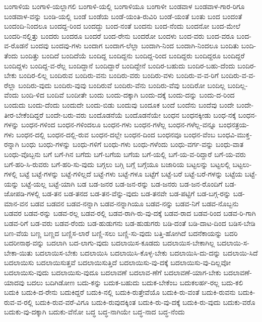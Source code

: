 {ಬಂಗಾಳಿಯ
ಬಂಗಾಳಿ-ಯಲ್ಲಾಗಲಿ
ಬಂಗಾಳಿ-ಯಲ್ಲಿ
ಬಂಗಾಳಿಯೂ
ಬಂಗಾಳೀ
ಬಂಡವಾಳ
ಬಂಡವಾಳ-ಗಾರ-ರಿಗೂ
ಬಂಡವಾಳ-ವನ್ನು
ಬಂಡಿ-ಯಲ್ಲಿ
ಬಂಡೆ
ಬಂಡೆಯ
ಬಂಡೆ-ಯಂತಿ-ರುವಿರಿ
ಬಂಡೆ-ಯಂತೆ
ಬಂತು
ಬಂದ
ಬಂದಂತೆ
ಬಂದಂದಿ-ನಿಂದಲೂ
ಬಂದದ್ದ-ರಿಂದ
ಬಂದದ್ದು
ಬಂದ-ನಂತೆ
ಬಂದನು
ಬಂದ-ನೆಂದು
ಬಂದನೋ
ಬಂದ-ಮೇಲೆ
ಬಂದರಿ-ನಲ್ಲಿತ್ತು
ಬಂದರು
ಬಂದರೂ
ಬಂದರೆ
ಬಂದ-ರೇನು
ಬಂದರೋ
ಬಂದಳು
ಬಂದ-ವರು
ಬಂದ-ವರೂ
ಬಂದ-ವ-ರೊಡನೆ
ಬಂದವು
ಬಂದವು-ಗಳು
ಬಂದಾಗ
ಬಂದಾಗ-ಲೆಲ್ಲಾ
ಬಂದಾಗಿ-ನಿಂದ
ಬಂದಾಗಿ-ನಿಂದಲೂ
ಬಂದಿತು
ಬಂದಿ-ತೆಂದು
ಬಂದಿತ್ತು
ಬಂದಿದೆ
ಬಂದಿದೆಯೆ
ಬಂದಿದ್ದ
ಬಂದಿದ್ದನು
ಬಂದಿದ್ದ-ರಿಂದ
ಬಂದಿದ್ದರು
ಬಂದಿದ್ದರೂ
ಬಂದಿದ್ದರೆ
ಬಂದಿದ್ದಳು
ಬಂದಿದ್ದ-ವ-ರೆಲ್ಲ
ಬಂದಿದ್ದಾನೆ
ಬಂದಿದ್ದಾರೆ
ಬಂದಿದ್ದೇನೆ
ಬಂದಿರ-ಬಹುದು
ಬಂದಿರ-ಬಹು-ದೆಂದು
ಬಂದಿರ-ಬೇಕು
ಬಂದಿರ-ಲಿಲ್ಲ
ಬಂದಿರುವ
ಬಂದಿರು-ವನು
ಬಂದಿರು-ವರು
ಬಂದಿರು-ವಳು
ಬಂದಿರು-ವ-ವ-ರಿಗೆ
ಬಂದಿರು-ವ-ವ-ರೆಲ್ಲಾ
ಬಂದಿರು-ವುದು
ಬಂದಿರು-ವುವು
ಬಂದಿರುವೆ
ಬಂದಿರು-ವೆನು
ಬಂದಿರು-ವೆವು
ಬಂದಿರೋ
ಬಂದಿಲ್ಲ
ಬಂದಿಲ್ಲ-ವೆಂದು
ಬಂದಿ-ಳಿದ
ಬಂದಿವೆ
ಬಂದೀತೇ
ಬಂದು
ಬಂದು-ದಕ್ಕಾಗಿ
ಬಂದು-ದಕ್ಕೆ
ಬಂದು-ದನ್ನು
ಬಂದು-ದ-ರಿಂದ
ಬಂದುದು
ಬಂದು-ದೆಂದು
ಬಂದುದೇ
ಬಂದು-ಬಿಡು
ಬಂದುವು
ಬಂದೂಕ
ಬಂದೆ
ಬಂದೆನು
ಬಂದೆವು
ಬಂದೇ
ಬಂದೇ-ತೀರ-ಬೇಕೆಂದಿದ್ದರೆ
ಬಂದೇ-ಬರು-ವರು
ಬಂದೊಡನೆಯೆ
ಬಂದೊಡನೆಯೇ
ಬಂಧನ
ಬಂಧನಕ್ಕೀಡು
ಬಂಧ-ನಕ್ಕೆ
ಬಂಧನ-ಗಳನ್ನು
ಬಂಧನ-ಗಳಿಂದ
ಬಂಧನ-ಗಳಿಂದಲೂ
ಬಂಧನ-ಗಳು
ಬಂಧನ-ಗಳೆಲ್ಲ
ಬಂಧನ-ಗಳೆಲ್ಲ-ವನ್ನೂ
ಬಂಧನತ್ರಯ-ಗಳು
ಬಂಧನ-ದಲ್ಲಿ
ಬಂಧನ-ದಲ್ಲಿ-ರುವ
ಬಂಧನ-ದಲ್ಲೇ
ಬಂಧನ-ದಿಂದ
ಬಂಧನವೂ
ಬಂಧನ-ವೆಂಬ
ಬಂಧವಿ-ಮುಕ್ತ-ರನ್ನಾಗಿ
ಬಂಧು
ಬಂಧು-ಗಳನ್ನು
ಬಂಧು-ಗಳಿಗೆ
ಬಂಧು-ಗಳು
ಬಂಧು-ಗಳೆಂದು
ಬಂಧು-ವರ್ಗ-ವನ್ನು
ಬಂಧು-ವಾತ
ಬಂಧು-ವೊಬ್ಬನು
ಬಗೆ
ಬಗೆ-ಗಿನ
ಬಗೆದು
ಬಗೆ-ಬಗೆಯ
ಬಗೆಯ
ಬಗೆ-ಯಲ್ಲಿ
ಬಗೆ-ಯ-ವ-ರಿದ್ದಾರೆ
ಬಗೆ-ಯ-ವರು
ಬಗೆ-ಹರಿ-ಸಿ-ರುವರು
ಬಗೆ-ಹರಿ-ಸು-ವುದು
ಬಗ್ಗಲು
ಬಗ್ಗಿ
ಬಗ್ಗೆ
ಬಗ್ಗೆಯೂ
ಬಜಾರಿಯ
ಬಟ್ಟಲನ್ನು
ಬಟ್ಟಲಲ್ಲಿ
ಬಟ್ಟಲು-ಗಳಲ್ಲಿ
ಬಟ್ಟೆ
ಬಟ್ಟೆ-ಗಳನ್ನು
ಬಟ್ಟೆ-ಗಳಿಲ್ಲದೆ
ಬಟ್ಟೆ-ಗಳು
ಬಟ್ಟೆ-ಗಳೂ
ಬಟ್ಟೆಗೆ
ಬಟ್ಟೆ-ಬರೆ
ಬಟ್ಟೆ-ಬರೆ-ಗಳನ್ನು
ಬಟ್ಟೆಯ
ಬಟ್ಟೆ-ಯನ್ನು
ಬಟ್ಟೆ-ಯಲ್ಲ
ಬಟ್ಟೆ-ಯಾಗಿ
ಬಡ
ಬಡ-ಜನರ
ಬಡ-ಜನ-ರನ್ನು
ಬಡ-ಜನರು
ಬಡ-ಜನ-ರೊಂದಿಗೆ
ಬಡ-ಜೋಪಡಿ-ಗಳಲ್ಲಿ
ಬಡ-ತನ
ಬಡ-ತನದ
ಬಡ-ತನ-ವೆನ್ನು-ವುದು
ಬಡ-ತನವೇ
ಬಡ-ಪಟ್ಟಿಗೆ
ಬಡ-ಬಗ್ಗ-ರನ್ನು
ಬಡ-ಮಾನ-ವನ
ಬಡವ
ಬಡವನ
ಬಡವ-ನನ್ನಾಗಿ
ಬಡವ-ನನ್ನಾಗಿಯೂ
ಬಡವ-ನನ್ನು
ಬಡವ-ನಿಗೆ
ಬಡವ-ನೊಬ್ಬನು
ಬಡವರ
ಬಡವ-ರನ್ನು
ಬಡವ-ರಲ್ಲ
ಬಡವ-ರಲ್ಲಿ
ಬಡವ-ರಾಗಿ-ರು-ವು-ದಕ್ಕೆ
ಬಡವ-ರಾದ
ಬಡವ-ರಿಂದ
ಬಡವ-ರಿ-ಗಾಗಿ
ಬಡವ-ರಿಗೆ
ಬಡ-ವರು
ಬಡವ-ರೆಂದು
ಬಡ-ಹುಡುಗನು
ಬಡ-ಹುಡುಗರು
ಬಡಿ-ದಂತೆ
ಬಡಿ-ದಾಟ-ದಿಂದ
ಬಡಿಸ-ಬೇಡಿ
ಬಣ-ವೆಯ
ಬಣ್ಣ
ಬಣ್ಣದ
ಬಣ್ಣಿಸ-ಲಾರೆ
ಬಣ್ಣಿ-ಸಲು
ಬಣ್ಣಿ-ಸು-ವುದು
ಬತ್ತಿ-ಹೋಗಿದೆ
ಬದನೆಕಾಯನ್ನು
ಬದರಿ
ಬದರೀನಾಥ-ವನ್ನು
ಬದಲಾಗಿ
ಬದ-ಲಾಗು-ವುದು
ಬದಲಾಯಿಸ-ಕೂಡದು
ಬದಲಾಯಿಸ-ಬೇಕಾಗಿಲ್ಲ
ಬದಲಾಯಿ-ಸ-ಬೇಕಾ-ಯಿತು
ಬದಲಾಯಿಸ-ಬೇಕು
ಬದಲಾಯಿಸಿ
ಬದಲಾಯಿಸಿ-ಕೊಳ್ಳ-ಬೇಕು
ಬದಲಾಯಿಸಿ-ದು-ದನ್ನು
ಬದಲಾಯಿ-ಸಿದೆ
ಬದಲಾಯಿಸು
ಬದಲಾಯಿಸುತ್ತವೆ
ಬದಲಾಯಿಸುತ್ತಿದೆ
ಬದಲಾಯಿಸು-ವು-ದಕ್ಕೆ
ಬದಲಾಯಿಸು-ವು-ದಿಲ್ಲವೋ
ಬದಲಾಯಿಸು-ವುದು
ಬದಲಾಯಿಸು-ವುದೂ
ಬದಲಾವಣೆ
ಬದಲಾವ-ಣೆಗೆ
ಬದಲಾವಣೆ-ಯಾಗ-ಬೇಕು
ಬದಲಾವಣೆ-ಯಾದವು
ಬದಲು
ಬದಿಗಿಡೋಣ
ಬದು-ಕನ್ನು
ಬದುಕ-ಬಹುದು
ಬದುಕ-ಬೇಕೆಂಬ
ಬದುಕಲರ್ಹ-ರಲ್ಲ
ಬದು-ಕಲಿ
ಬದುಕಿ
ಬದುಕಿ-ದ-ರೇನು
ಬದುಕಿದ್ದರೆ
ಬದುಕಿ-ನಲ್ಲಿ
ಬದುಕಿ-ರುತ್ತೇವೆಯೊ
ಬದುಕಿ-ರು-ವಂತೆ
ಬದುಕಿ-ರುವನು
ಬದುಕಿ-ರುವ-ವ-ರಲ್ಲಿ
ಬದುಕಿ-ರುವ-ವರೆ-ವಿಗೂ
ಬದುಕಿ-ರುವುದಕ್ಕಿಂತ
ಬದುಕಿ-ರು-ವು-ದಕ್ಕೆ
ಬದುಕಿ-ರು-ವುದು
ಬದುಕು-ವರೊ
ಬದುಕು-ವು-ದಕ್ಕಾಗಿ
ಬದುಕು-ವೆನೋ
ಬದ್ಧ
ಬದ್ಧ-ನಾಗಿಯೇ
ಬದ್ಧ-ನಾದ
ಬದ್ಧ-ನೆಂದು
}
